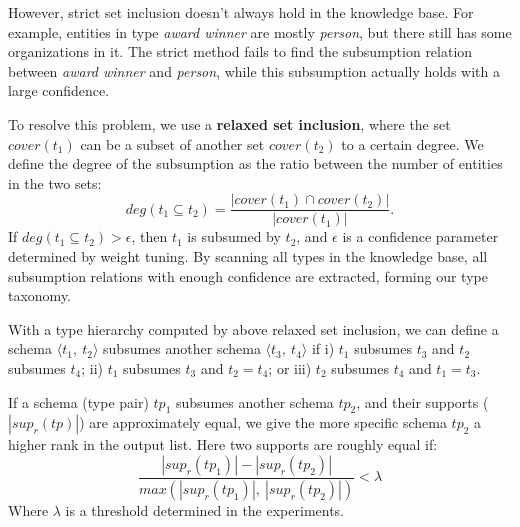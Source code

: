 However, strict set inclusion doesn't always hold in the knowledge base.
For example, entities in type \textit{award winner} are mostly \textit{person}, but there still has some
organizations in it. The strict method fails to find the subsumption relation between \textit{award winner}
and \textit{person}, while this subsumption actually holds with a large confidence. 
%

To resolve this problem, we use a \textbf{relaxed set inclusion},
where the set $cover(t_1)$ can be a subset of another set $cover(t_2)$ to a certain degree.
We define the degree of the subsumption as the ratio between the number 
of entities in the two sets: 
\begin{equation}
deg(t_1 \subseteq t_2) = \frac{\left|cover(t_1) \cap cover(t_2)\right|} {\left|cover(t_1)\right|}.
\end{equation}
If $deg(t_1 \subseteq t_2) > \epsilon$,
then $t_1$ is subsumed by $t_2$, and $\epsilon$ is a confidence parameter 
determined by weight tuning.
By scanning all types in the knowledge base, all subsumption relations 
with enough confidence are extracted, forming our type taxonomy.

With a type hierarchy computed by above relaxed set inclusion, 
we can define a schema 
$\langle t_1,\ t_2\rangle$ subsumes another schema
$\langle t_3,\ t_4\rangle$ if 
i) $t_1$ subsumes $t_3$ and $t_2$ subsumes $t_4$;
ii) $t_1$ subsumes $t_3$ and $t_2 = t_4$; or
iii) $t_2$ subsumes $t_4$ and $t_1 = t_3$.

If a schema (type pair) $tp_1$ subsumes another schema $tp_2$, 
and their supports ($|sup_{r}(tp)|$) are approximately equal, 
we give the more specific schema $tp_2$ a higher rank in the output list.
Here two supports are roughly equal if:
\begin{equation}
\frac{\left|sup_{r}(tp_1)\right|-\left|sup_{r}(tp_2)\right|} {max(\left|sup_{r}(tp_1)\right|,\ \left|sup_{r}(tp_2)\right|)} < \lambda
\end{equation}
\noindent
Where $\lambda$ is a threshold determined in the experiments.
